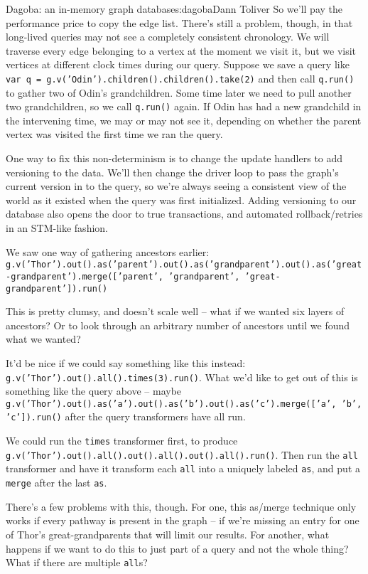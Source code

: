 \begin{aosachapter}{Dagoba: an in-memory graph database}{s:dagoba}{Dann Toliver}
So we'll pay the performance price to copy the edge list. There's still
a problem, though, in that long-lived queries may not see a completely
consistent chronology. We will traverse every edge belonging to a vertex
at the moment we visit it, but we visit vertices at different clock
times during our query. Suppose we save a query like
\texttt{var q = g.v('Odin').children().children().take(2)} and then call
\texttt{q.run()} to gather two of Odin's grandchildren. Some time later
we need to pull another two grandchildren, so we call \texttt{q.run()}
again. If Odin has had a new grandchild in the intervening time, we may
or may not see it, depending on whether the parent vertex was visited
the first time we ran the query.

One way to fix this non-determinism is to change the update handlers to
add versioning to the data. We'll then change the driver loop to pass
the graph's current version in to the query, so we're always seeing a
consistent view of the world as it existed when the query was first
initialized. Adding versioning to our database also opens the door to
true transactions, and automated rollback/retries in an STM-like
fashion.

\label{future-directions}

We saw one way of gathering ancestors earlier:
\texttt{g.v('Thor').out().as('parent').out().as('grandparent').out().as('great-grandparent').merge({[}'parent', 'grandparent', 'great-grandparent'{]}).run()}

This is pretty clumsy, and doesn't scale well -- what if we wanted six
layers of ancestors? Or to look through an arbitrary number of ancestors
until we found what we wanted?

It'd be nice if we could say something like this instead:
\texttt{g.v('Thor').out().all().times(3).run()}. What we'd like to get
out of this is something like the query above -- maybe
\texttt{g.v('Thor').out().as('a').out().as('b').out().as('c').merge({[}'a', 'b', 'c'{]}).run()}
after the query transformers have all run.

We could run the \texttt{times} transformer first, to produce
\texttt{g.v('Thor').out().all().out().all().out().all().run()}. Then run
the \texttt{all} transformer and have it transform each \texttt{all}
into a uniquely labeled \texttt{as}, and put a \texttt{merge} after the
last \texttt{as}.

There's a few problems with this, though. For one, this as/merge
technique only works if every pathway is present in the graph -- if
we're missing an entry for one of Thor's great-grandparents that will
limit our results. For another, what happens if we want to do this to
just part of a query and not the whole thing? What if there are multiple
\texttt{all}s?


\end{aosachapter}
